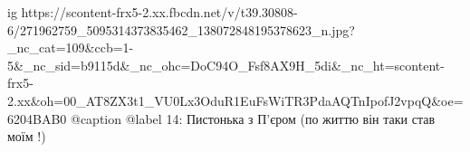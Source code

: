  
 
 
 
 

\ifcmt
  ig https://scontent-frx5-2.xx.fbcdn.net/v/t39.30808-6/271962759_5095314373835462_138072848195378623_n.jpg?_nc_cat=109&ccb=1-5&_nc_sid=b9115d&_nc_ohc=DoC94O_Fsf8AX9H_5di&_nc_ht=scontent-frx5-2.xx&oh=00_AT8ZX3t1_VU0Lx3OduR1EuFsWiTR3PdaAQTnIpofJ2vpqQ&oe=6204BAB0
  @caption @label 14: Пистонька з П'єром (по життю він таки став моїм !)
\fi
